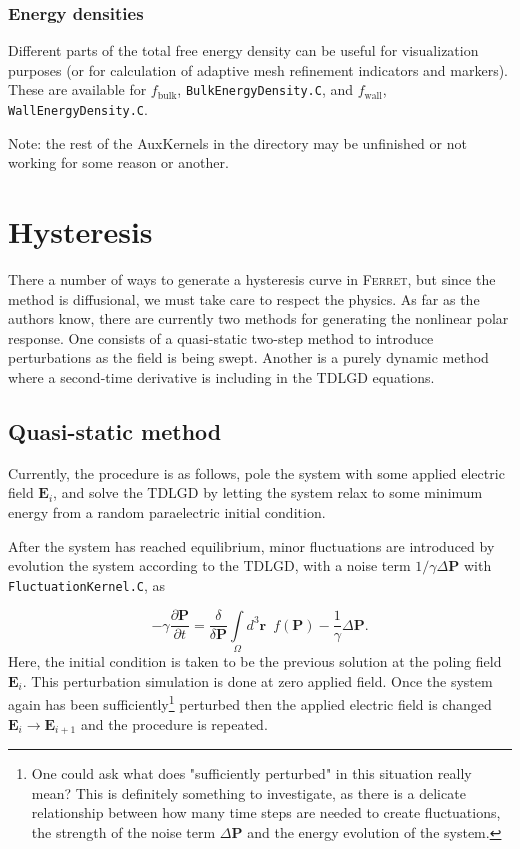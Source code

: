 \documentclass[16pt]{article} %
\begin{document}
%
\subsubsection{Energy densities}

Different parts of the total free energy density can be useful for visualization purposes (or for calculation of adaptive mesh refinement indicators and markers). These are available for $f_\mathrm{bulk}$, \texttt{BulkEnergyDensity.C}, and $f_\mathrm{wall}$, \texttt{WallEnergyDensity.C}.

Note: the rest of the AuxKernels in the directory may be unfinished or not working for some reason or another.


\section{Hysteresis}

There a number of ways to generate a hysteresis curve in \textsc{Ferret}, but since the method is diffusional, we must take care to respect the physics. As far as the authors know, there are currently two methods for generating the nonlinear polar response. One consists of a quasi-static two-step method to introduce perturbations as the field is being swept. Another is a purely dynamic method where a second-time derivative is including in the TDLGD equations.

\subsection{Quasi-static method}

 Currently, the procedure is as follows, pole the system with some applied electric field $\textbf{E}_i$, and solve the TDLGD by letting the system relax to some minimum energy from a random paraelectric initial condition. 

After the system has reached equilibrium, minor fluctuations are introduced by evolution the system according to the TDLGD, with a noise term $1/\gamma \Delta \textbf{P}$ with \texttt{FluctuationKernel.C}, as

\begin{equation}\tag{40}
- \gamma \frac{\partial \textbf{P}}{\partial t} =  \frac{\delta}{\delta \textbf{P}}\int\limits_\Omega d^3 \textbf{r} \,\,\,f\left(\textbf{P} \right)  - \frac{1}{\gamma} \Delta \textbf{P}.
\end{equation}
%
Here, the initial condition is taken to be the previous solution at the poling field $\textbf{E}_i$. This perturbation simulation is done at zero applied field. 
%
Once the system again has been sufficiently\footnote{One could ask what does "sufficiently perturbed" in this situation really mean? This is definitely something to investigate, as there is a delicate relationship between how many time steps are needed to create fluctuations, the strength of the noise term $\Delta \textbf{P}$ and the energy evolution of the system.} perturbed then the applied electric field is changed $\textbf{E}_{i} \to \textbf{E}_{i+1}$ and the procedure is repeated.
%
\end{document}
